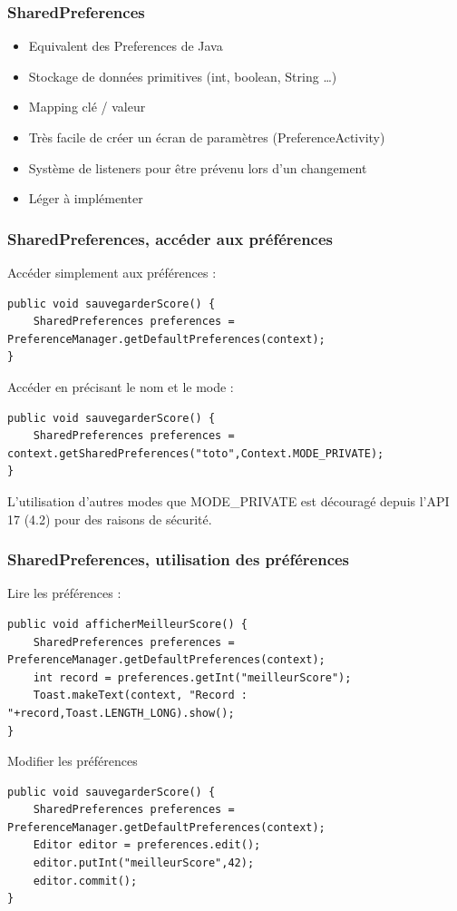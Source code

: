 \documentclass{beamer}
\begin{document}
\begin{frame}
\frametitle{SharedPreferences}
\begin{itemize}
    \item Equivalent des Preferences de Java
    \item Stockage de données primitives (int, boolean, String \ldots)
    \item Mapping clé / valeur
    \item Très facile de créer un écran de paramètres (PreferenceActivity)
    \item Système de listeners pour être prévenu lors d'un changement
    \item Léger à implémenter
\end{itemize}
\end{frame}
\begin{frame}[fragile]
\frametitle{SharedPreferences, accéder aux préférences}
Accéder simplement aux préférences :\\
\begin{lstlisting}
public void sauvegarderScore() {
    SharedPreferences preferences = PreferenceManager.getDefaultPreferences(context);
}
\end{lstlisting}
Accéder en précisant le nom et le mode :\\
\begin{lstlisting}
public void sauvegarderScore() {
    SharedPreferences preferences = context.getSharedPreferences("toto",Context.MODE_PRIVATE);
}
\end{lstlisting}
L'utilisation d'autres modes que MODE\_PRIVATE est découragé depuis l'API 17 (4.2) pour des raisons de sécurité.\\
\end{frame}
\begin{frame}[fragile]
\frametitle{SharedPreferences, utilisation des préférences}
Lire les préférences :\\
\begin{lstlisting}
public void afficherMeilleurScore() {
    SharedPreferences preferences = PreferenceManager.getDefaultPreferences(context);
    int record = preferences.getInt("meilleurScore");
    Toast.makeText(context, "Record : "+record,Toast.LENGTH_LONG).show();
}
\end{lstlisting}
Modifier les préférences\\
\begin{lstlisting}
public void sauvegarderScore() {
    SharedPreferences preferences = PreferenceManager.getDefaultPreferences(context);
    Editor editor = preferences.edit();
    editor.putInt("meilleurScore",42);
    editor.commit();
}
\end{lstlisting}
\end{frame}
\end{document}
